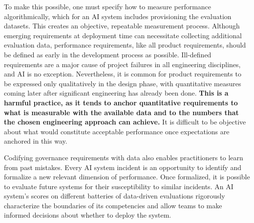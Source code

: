 To make this possible, one must specify how to measure performance algorithmically, which for an AI system includes provisioning the evaluation datasets. This creates an objective, repeatable measurement process.  Although emerging requirements at deployment time can necessitate collecting additional evaluation data, performance requirements, like all product requirements, should be defined as early in the development process as possible. Ill-defined requirements are a major cause of project failures in all engineering disciplines, and AI is no exception. 
Nevertheless, it is common for product requirements to be expressed only qualitatively in the design phase, with quantitative measures coming later after significant engineering has already been done. \textbf{This is a harmful practice, as it tends to anchor quantitative requirements to what is measurable with the available data and to the numbers that the chosen engineering approach can achieve.} It is difficult to be objective about what would constitute acceptable performance once expectations are anchored in this way.

Codifying governance requirements with data also enables practitioners to learn from past mistakes. Every AI system incident is an opportunity to identify and formalize a new relevant dimension of performance. Once formalized, it is possible to evaluate future systems for their susceptibility to similar incidents. An AI system's scores on different batteries of data-driven evaluations rigorously characterize the boundaries of its competencies and allow teams to make informed decisions about whether to deploy the system.

